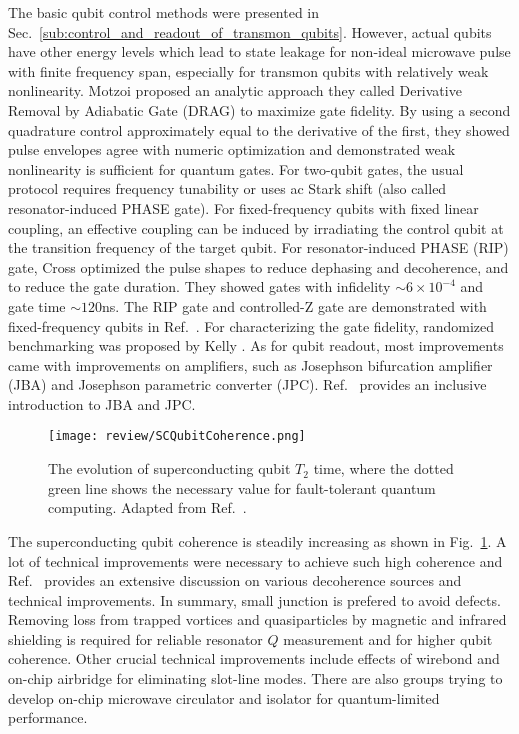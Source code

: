 The basic qubit control methods were presented in Sec.~\ref{sub:control_and_readout_of_transmon_qubits}. However, actual qubits have other energy levels which lead to state leakage for non-ideal microwave pulse with finite frequency span, especially for transmon qubits with relatively weak nonlinearity. Motzoi \etal{} proposed an analytic approach they called Derivative Removal by Adiabatic
Gate (DRAG) to maximize gate fidelity\cite{Motzoi2009}. By using a second quadrature control approximately equal to the derivative of the first, they showed pulse envelopes agree with numeric optimization and demonstrated weak nonlinearity is sufficient for quantum gates. For two-qubit gates, the usual protocol\cite{DiCarlo2009} requires frequency tunability or uses ac Stark shift\cite{Majer2007} (also called resonator-induced PHASE gate). For fixed-frequency qubits with fixed linear coupling, an effective coupling can be induced by irradiating the control qubit at the transition frequency of the target qubit\cite{Rigetti2010}. For resonator-induced PHASE (RIP) gate, Cross \etal{} optimized the pulse shapes to reduce dephasing and decoherence, and to reduce the gate duration\cite{Cross2015}. They showed gates with infidelity $\sim 6\times 10^{-4}$ and gate time $\sim 120$ns. The RIP gate and controlled-Z gate are demonstrated with fixed-frequency qubits in Ref.~. For characterizing the gate fidelity, randomized benchmarking was proposed by Kelly \etal{}\cite{Kelly2014}. As for qubit readout, most improvements came with improvements on amplifiers, such as Josephson bifurcation amplifier (JBA)\cite{Siddiqi2004} and Josephson parametric converter (JPC)\cite{Bergeal2010}. Ref.~ provides an inclusive introduction to JBA and JPC.




            \begin{figure}[h]
                \centering
                \texttt{[image: review/SCQubitCoherence.png]}
                \caption{The evolution of superconducting qubit $T_2$ time, where the dotted green line shows the necessary value for fault-tolerant quantum computing. Adapted from Ref.~.}
                \label{fig:SCQubitCoherence}
            \end{figure}



The superconducting qubit coherence is steadily increasing as shown in Fig.~\ref{fig:SCQubitCoherence}. A lot of technical improvements were necessary to achieve such high coherence and Ref.~ provides an extensive discussion on various decoherence sources and technical improvements. In summary, small junction is prefered to avoid defects. Removing loss from trapped vortices and quasiparticles by magnetic\cite{Barends2011,Martinis2014Report} and infrared\cite{Corcoles2011,Barends2011} shielding is required for reliable resonator $Q$ measurement and for higher qubit coherence. Other crucial technical improvements include effects of wirebond\cite{Wenner2011} and on-chip airbridge for eliminating slot-line modes\cite{Chen2014}. There are also groups trying to develop on-chip microwave circulator and isolator for quantum-limited performance\cite{Kerckhoff2015}.


